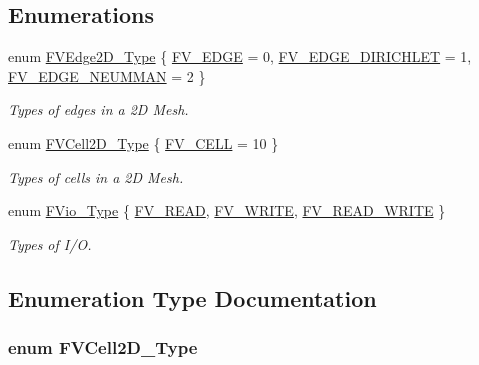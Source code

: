 \subsection*{Enumerations}
\begin{DoxyCompactItemize}
\item 
enum \hyperlink{namespaceFVL_a854be4189a88b254bfd8d4c4c0b1736f}{FVEdge2D\_\-Type} \{ \hyperlink{namespaceFVL_a854be4189a88b254bfd8d4c4c0b1736fa5dd138e0c6bccc410834fa09c422bf1a}{FV\_\-EDGE} =  0, 
\hyperlink{namespaceFVL_a854be4189a88b254bfd8d4c4c0b1736faa3d12995e6a8cbc18fe218a2f2639635}{FV\_\-EDGE\_\-DIRICHLET} =  1, 
\hyperlink{namespaceFVL_a854be4189a88b254bfd8d4c4c0b1736fa0d52d6dca00f75adf8ce66d13466b02d}{FV\_\-EDGE\_\-NEUMMAN} =  2
 \}
\begin{DoxyCompactList}\small\item\em Types of edges in a 2D Mesh. \item\end{DoxyCompactList}\item 
enum \hyperlink{namespaceFVL_ae01eed8067b17a985aa9c1f87956a6cd}{FVCell2D\_\-Type} \{ \hyperlink{namespaceFVL_ae01eed8067b17a985aa9c1f87956a6cda22b17c2dd52829f533777105d078f91e}{FV\_\-CELL} =  10
 \}
\begin{DoxyCompactList}\small\item\em Types of cells in a 2D Mesh. \item\end{DoxyCompactList}\item 
enum \hyperlink{namespaceFVL_a9d5a618bda11c0d24d3156fd55de01cb}{FVio\_\-Type} \{ \hyperlink{namespaceFVL_a9d5a618bda11c0d24d3156fd55de01cba80bd9d3a93ea0f1fcabc1f5362b316e5}{FV\_\-READ}, 
\hyperlink{namespaceFVL_a9d5a618bda11c0d24d3156fd55de01cba4087ae3f65d7b46f5f9c9babfc05e4e1}{FV\_\-WRITE}, 
\hyperlink{namespaceFVL_a9d5a618bda11c0d24d3156fd55de01cba99b66a4643acf68c64fc65cb109f0181}{FV\_\-READ\_\-WRITE}
 \}
\begin{DoxyCompactList}\small\item\em Types of I/O. \item\end{DoxyCompactList}\end{DoxyCompactItemize}


\subsection{Enumeration Type Documentation}
\hypertarget{namespaceFVL_ae01eed8067b17a985aa9c1f87956a6cd}{
\subsubsection[{FVCell2D\_\-Type}]{\setlength{\rightskip}{0pt plus 5cm}enum {\bf FVCell2D\_\-Type}}}
\label{dd/d11/namespaceFVL_ae01eed8067b17a985aa9c1f87956a6cd}


